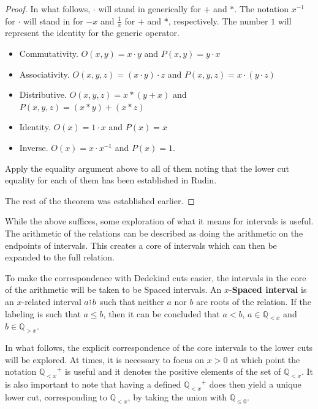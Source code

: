 \documentclass[12pt]{article}
\newcommand{\qcut}[2][x]{\ensuremath{\mathbb{Q}_{#2 #1}}}
\newcommand{\qlt}[1][x]{\qcut[#1]{<}}
\newcommand{\qgt}[1][x]{\qcut[#1]{>}}
\newcommand{\qleq}[1][x]{\qcut[#1]{\leq}}
\begin{document}
\begin{proof}
    In what follows, $\cdot$ will stand in generically for $+$ and $*$. The notation $x^{-1}$ for $\cdot$ will stand in for $-x$ and $\frac{1}{x}$ for $+$ and $*$, respectively. The number $1$ will represent the identity for the generic operator.
    \begin{itemize}
        \item Commutativity. $O(x,y) = x \cdot y$ and $P(x,y)= y \cdot x$
        \item Associativity. $O(x,y,z)= (x\cdot y) \cdot z$ and $P(x,y,z)=x \cdot (y \cdot z)$
        \item Distributive.  $O(x,y,z)= x*(y+x)$ and $P(x,y,z)= (x*y) + (x*z)$
        \item Identity. $O(x) = 1 \cdot x$ and $P(x)= x$
        \item Inverse. $O(x) = x \cdot x^{-1}$ and $P(x)= 1$.
    \end{itemize}
    
    Apply the equality argument above to all of them noting that the lower cut equality for each of them has been established in Rudin. 

    The rest of the theorem was established earlier. 
\end{proof}
\endgroup

While the above suffices, some exploration of what it means for intervals is useful. The arithmetic of the relations  can be described as doing the arithmetic on the endpoints of intervals. This creates a core of intervals which can then be expanded to the full relation. 

To make the correspondence with Dedekind cuts easier, the intervals in the core of the arithmetic will be taken to be Spaced intervals. An $x$-\textbf{Spaced interval} is an $x$-related interval $a \rint b$ such that neither $a$ nor $b$ are roots of the relation. If the labeling is such that $a \leq b$, then it can be concluded that $a < b$, $a \in \qlt$ and $b \in \qgt$.

In what follows, the explicit correspondence of the core intervals to the lower cuts will be explored.  At times, it is necessary to focus on $x > 0$ at which point the notation $\qlt^+$ is useful and it denotes the positive elements of the set of $\qlt$. It is also important to note that having a defined $\qlt^+$ does then yield a unique lower cut, corresponding to $\qlt$, by taking the union with $\qleq[0]$.
\end{document}
